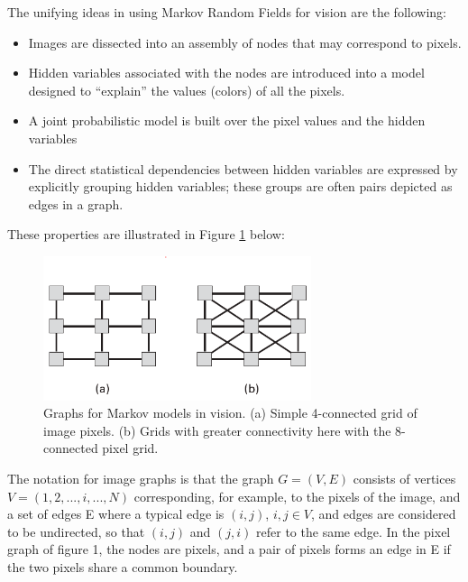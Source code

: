 The unifying ideas in using Markov Random Fields for vision are the following:
\begin{itemize}
	\item Images are dissected into an assembly of nodes that may correspond to pixels.
	\item Hidden variables associated with the nodes are introduced into a model designed to “explain” the values (colors) of all the pixels.
	\item  A joint probabilistic model is built over the pixel values and the hidden variables
	\item The direct statistical dependencies between hidden  variables are expressed by explicitly grouping hidden variables; these groups are often pairs depicted as edges in a graph.
\end{itemize}
These properties are illustrated in Figure \ref{fig:connectivity} below:
\begin{figure}[H]
	\centering
	\includegraphics[width=0.7\textwidth]{fig/Connectivity.PNG}
	\caption{Graphs for Markov models in vision. (a) Simple 4-connected grid of image pixels. (b) Grids with greater connectivity
		here with the 8-connected pixel grid.}
	\label{fig:connectivity}
\end{figure}
The notation for image graphs is that the graph $G = (V, E)$ consists of vertices $V =(1, 2, . . . , i, . . . , N)$ corresponding, for example, to the pixels of the image, and a set of edges E where a typical edge is $(i, j)$, $i, j \in V$, and edges are considered to be undirected, so that $(i, j)$ and $(j, i)$ refer to the same edge. In the pixel graph of figure 1, the nodes are pixels, and a pair of pixels forms an edge in E if the two pixels share a common boundary.

